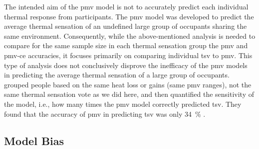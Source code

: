 The intended aim of the \ac{pmv} model is not to accurately predict each individual thermal response from participants.
The \ac{pmv} model was developed to predict the average thermal sensation of an undefined large group of occupants sharing the same environment.
Consequently, while the above-mentioned analysis is needed to compare for the same sample size in each thermal sensation group the \ac{pmv} and \ac{pmv-ce} accuracies, it focuses primarily on comparing individual \ac{tsv} to \ac{pmv}.
This type of analysis does not conclusively disprove the inefficacy of the \ac{pmv} models in predicting the average thermal sensation of a large group of occupants.
 grouped people based on the same heat loss or gains (same \ac{pmv} ranges), not the same thermal sensation vote as we did here, and then quantified the sensitivity of the model, i.e., how many times the \ac{pmv} model correctly predicted \ac{tsv}.
They found that the accuracy of \ac{pmv} in predicting \ac{tsv} was only \qty{34}{\percent} .

\subsection{Model Bias}\label{subsec:model-bias}


